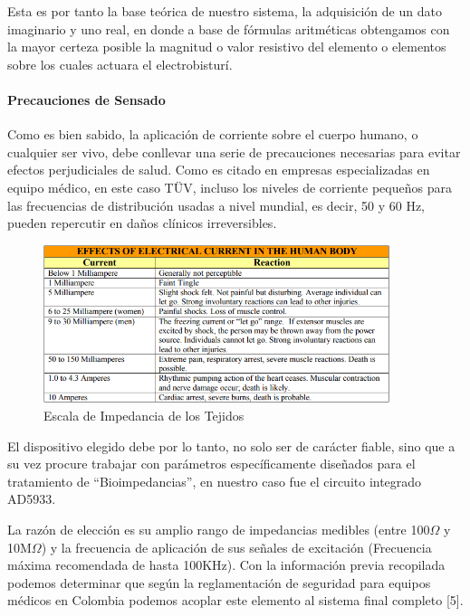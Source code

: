 \documentclass[12pt,letterpaper,spanish]{article}
\begin{document}
				Esta es por tanto la base teórica de nuestro sistema, la adquisición de un dato imaginario y uno real, en donde a base de fórmulas aritméticas obtengamos con la mayor certeza posible la magnitud o valor resistivo del elemento o elementos sobre los cuales actuara el electrobisturí.

				\paragraph{Precauciones de Sensado}
				\hfill\break
				Como es bien sabido, la aplicación de corriente sobre el cuerpo humano, o cualquier ser vivo, debe conllevar una serie de precauciones necesarias para evitar efectos perjudiciales de salud. 
Como es citado en empresas especializadas en equipo médico, en este caso TÜV, incluso los niveles de corriente pequeños para las frecuencias de distribución usadas a nivel mundial, es decir, 50 y 60 Hz, pueden repercutir en daños clínicos irreversibles.
			
				\begin{figure}[H]
					\centering
					\includegraphics[width=0.9\textwidth]{./Imagenes/Current_Ef.png}
					\caption{Escala de Impedancia de los Tejidos}
				\end{figure}			
			
				El dispositivo elegido debe por lo tanto, no solo ser de carácter fiable, sino que a su vez procure trabajar con parámetros específicamente diseñados para el tratamiento de “Bioimpedancias”, en nuestro caso fue el circuito integrado AD5933.
			
				La razón de elección es su amplio rango de impedancias medibles (entre 100$\Omega$ y 10M$\Omega$) y la frecuencia de aplicación de sus señales de excitación (Frecuencia máxima recomendada de hasta 100KHz). Con la información previa recopilada podemos determinar que según la reglamentación de seguridad para equipos médicos en Colombia podemos acoplar este elemento al sistema final completo [5].
		
\end{document}
